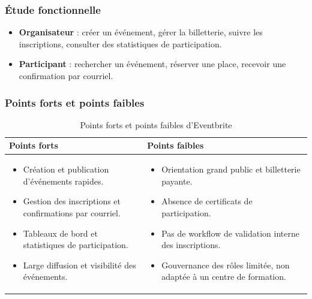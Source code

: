\documentclass[12pt,a4paper,oneside]{report}
\begin{document}
\subsubsection{Étude fonctionnelle}
\begin{itemize}[leftmargin=1.2cm]
  \item \textbf{Organisateur} : créer un événement, gérer la billetterie, suivre les
  inscriptions, consulter des statistiques de participation.
  \item \textbf{Participant} : rechercher un événement, réserver une place, recevoir une
  confirmation par courriel.
\end{itemize}

\subsubsection{Points forts et points faibles}
\begin{table}[H]\centering\renewcommand{\arraystretch}{1.25}
\begin{tabular}{|p{}|p{}|}\hline
\rowcolor{gray!15}\textbf{Points forts} & \textbf{Points faibles} \\ \hline
\begin{itemize}[leftmargin=*,topsep=4pt,itemsep=2pt]
  \item Création et publication d'événements rapides.
  \item Gestion des inscriptions et confirmations par courriel.
  \item Tableaux de bord et statistiques de participation.
  \item Large diffusion et visibilité des événements.
\end{itemize}
&
\begin{itemize}[leftmargin=*,topsep=4pt,itemsep=2pt]
  \item Orientation grand public et billetterie payante.
  \item Absence de certificats de participation.
  \item Pas de workflow de validation interne des inscriptions.
  \item Gouvernance des rôles limitée, non adaptée à un centre de formation.
\end{itemize} \\ \hline
\end{tabular}
\caption{Points forts et points faibles d'Eventbrite}\label{tab:eventbrite}
\end{table}
\end{document}
